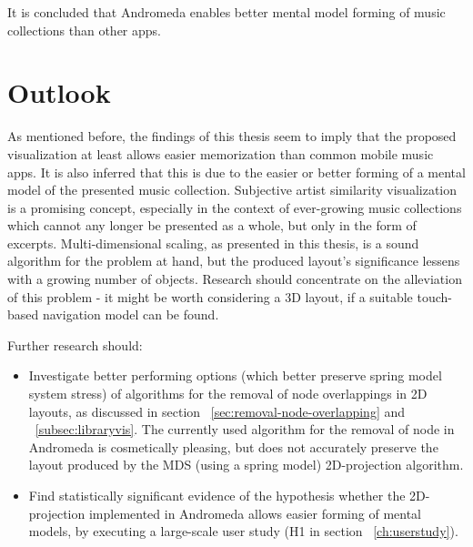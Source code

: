  It is concluded that Andromeda enables better mental model forming of music collections than other apps.

\section{Outlook}

As mentioned before, the findings of this thesis seem to imply that the proposed visualization at least allows easier memorization than common mobile music apps. It is also inferred that this is due to the easier or better forming of a mental model of the presented music collection. Subjective artist similarity visualization is a promising concept, especially in the context of ever-growing music collections which cannot any longer be presented as a whole, but only in the form of excerpts. Multi-dimensional scaling, as presented in this thesis, is a sound algorithm for the problem at hand, but the produced layout's significance lessens with a growing number of objects. Research should concentrate on the alleviation of this problem - it might be worth considering a 3D layout, if a suitable touch-based navigation model can be found.

Further research should:
\begin{itemize}
  \item Investigate better performing options (which better preserve spring model system stress) of algorithms for the removal of node overlappings in 2D layouts, as discussed in section ~\ref{sec:removal-node-overlapping} and ~\ref{subsec:libraryvis}. The currently used algorithm for the removal of node in Andromeda is cosmetically pleasing, but does not accurately preserve the layout produced by the MDS (using a spring model) 2D-projection algorithm.


  \item Find statistically significant evidence of the hypothesis whether the 2D-projection implemented in Andromeda allows easier forming of mental models, by executing a large-scale user study (H1 in section ~\ref{ch:userstudy}).

\end{itemize}